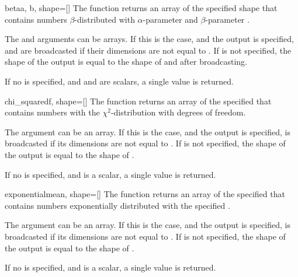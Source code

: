 \begin{funcdesc}{beta}{a, b, shape=[]}
   The  function returns an array of the specified shape that
   contains  numbers $\beta$-distributed with $\alpha$-parameter
    and $\beta$-parameter . 
   
   The  and  arguments can be arrays. If this is the case, and
   the output  is specified,  and  are broadcasted if
   their dimensions are not equal to . If  is not
   specified, the shape of the output is equal to the shape of  and
    after broadcasting.
   
   If no  is specified, and  and  are
   scalars, a single value is returned.
\end{funcdesc}

\begin{funcdesc}{chi_square}{df, shape=[]}
   The  function returns an array of the specified
    that contains  numbers with the
   $\chi^2$-distribution with  degrees of freedom.
   
   The  argument can be an array. If this is the case, and the output
    is specified,  is broadcasted if its dimensions are not
   equal to . If  is not specified, the shape of the
   output is equal to the shape of .
   
   If no  is specified, and  is a scalar, a single value is
   returned.
\end{funcdesc}

\begin{funcdesc}{exponential}{mean, shape=[]}
   The  function returns an array of the specified
    that contains  numbers exponentially distributed
   with the specified . 
   
   The  argument can be an array. If this is the case, and the output
    is specified,  is broadcasted if its dimensions are
   not equal to . If  is not specified, the shape of the
   output is equal to the shape of .
   
   If no  is specified, and  is a scalar, a single value
   is returned.
\end{funcdesc}

